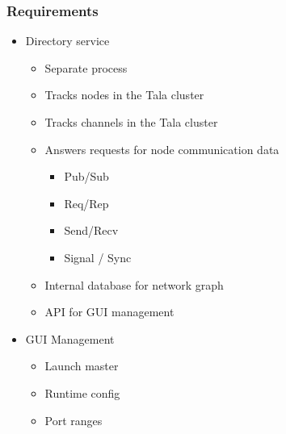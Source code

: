 \documentclass[xcolor=svgnames]{beamer}
\begin{document}
\begin{frame}[fragile]
  \frametitle{Requirements}

\begin{itemize}
\item Directory service 
\begin{itemize}
\item  Separate process
\item  Tracks nodes in the Tala cluster
\item  Tracks channels in the Tala cluster
\item  Answers requests for node communication data
\begin{itemize}
\item Pub/Sub
\item Req/Rep
\item Send/Recv
\item Signal / Sync
\end{itemize}
\item  Internal database for network graph
\item  API for GUI management
\end{itemize}

\item GUI Management
\begin{itemize}
\item  Launch master
\item  Runtime config
\item  Port ranges
\end{itemize}

\end{itemize}
\end{frame}
\end{document}
